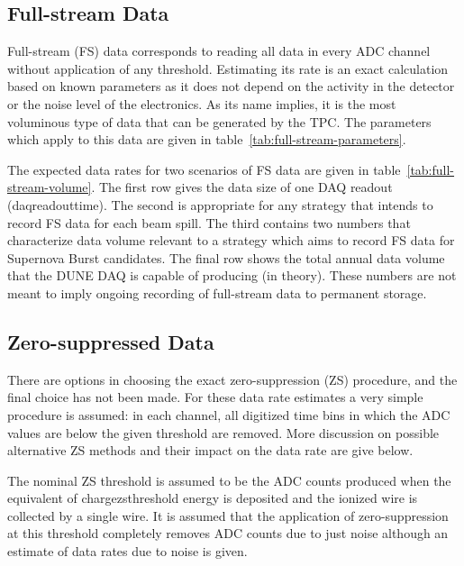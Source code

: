 %

\subsection{Full-stream Data}

Full-stream (FS) data corresponds to reading all data in every ADC channel without application of any threshold.
Estimating its rate is an exact calculation based on known parameters as it does not depend on
the activity in the detector or the noise level of the electronics.
As its name implies, it is the most voluminous type of data that can be generated by the TPC.
The parameters which apply to this data are given in table~\ref{tab:full-stream-parameters}.

%

The expected data rates for two scenarios of FS data are given
in table~\ref{tab:full-stream-volume}.
The first row gives the data size of one DAQ readout (daqreadouttime).
The second is appropriate for any strategy that intends to record FS
data for each beam spill.
The third contains two numbers that characterize data volume relevant to a strategy which aims to record FS data
for Supernova Burst candidates.
The final row  shows the total annual data volume that the DUNE DAQ is capable of producing (in theory).
These numbers are not meant to imply ongoing recording of full-stream
data to permanent storage.

%

\subsection{Zero-suppressed Data}

There are options in choosing the exact zero-suppression (ZS) procedure,
and the final choice has not been made.
For these data rate estimates a very simple procedure is assumed: in each
channel, all digitized time bins in which the ADC values are below
the given threshold are removed.
More discussion on possible alternative ZS methods and their impact on
the data rate are give below.

The nominal ZS threshold is assumed to be the ADC counts produced when
the equivalent of chargezsthreshold energy is deposited and the
ionized wire is collected by a single wire.
It is assumed that the application of zero-suppression at this
threshold completely removes ADC counts due to just noise although an
estimate of data rates due to noise is given.

